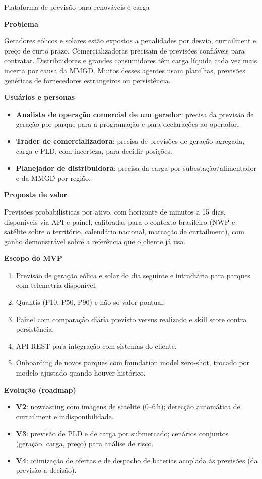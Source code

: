 \documentclass[10pt,a4paper,oneside]{article}
\newcommand{\prodsec}[1]{\par\medskip\noindent\textbf{\color{prodcolor}#1}\par\smallskip}
\begin{document}
\begin{produto}{Plataforma de previsão para renováveis e carga}

\prodsec{Problema}
Geradores eólicos e solares estão expostos a penalidades por desvio,
curtailment e preço de curto prazo. Comercializadoras precisam de previsões
confiáveis para contratar. Distribuidoras e grandes consumidores têm carga
líquida cada vez mais incerta por causa da MMGD. Muitos desses agentes usam
planilhas, previsões genéricas de fornecedores estrangeiros ou persistência.

\prodsec{Usuários e personas}
\begin{itemize}
  \item \textbf{Analista de operação comercial de um gerador}: precisa da
    previsão de geração por parque para a programação e para declarações ao
    operador.
  \item \textbf{Trader de comercializadora}: precisa de previsões de geração
    agregada, carga e PLD, com incerteza, para decidir posições.
  \item \textbf{Planejador de distribuidora}: precisa da carga por
    subestação/alimentador e da MMGD por região.
\end{itemize}

\prodsec{Proposta de valor}
Previsões probabilísticas por ativo, com horizonte de minutos a 15 dias,
disponíveis via API e painel, calibradas para o contexto brasileiro (NWP e
satélite sobre o território, calendário nacional, marcação de curtailment),
com ganho demonstrável sobre a referência que o cliente já usa.

\prodsec{Escopo do MVP}
\begin{enumerate}
  \item Previsão de geração eólica e solar do dia seguinte e intradiária
    para parques com telemetria disponível.
  \item Quantis (P10, P50, P90) e não só valor pontual.
  \item Painel com comparação diária previsto versus realizado e skill score
    contra persistência.
  \item API REST para integração com sistemas do cliente.
  \item Onboarding de novos parques com foundation model zero-shot, trocado
    por modelo ajustado quando houver histórico.
\end{enumerate}

\prodsec{Evolução (roadmap)}
\begin{itemize}
  \item \textbf{V2}: nowcasting com imagens de satélite (0--6\,h);
    detecção automática de curtailment e indisponibilidade.
  \item \textbf{V3}: previsão de PLD e de carga por submercado; cenários
    conjuntos (geração, carga, preço) para análise de risco.
  \item \textbf{V4}: otimização de ofertas e de despacho de baterias acoplada
    às previsões (da previsão à decisão).
\end{itemize}


\end{produto}
\end{document}
